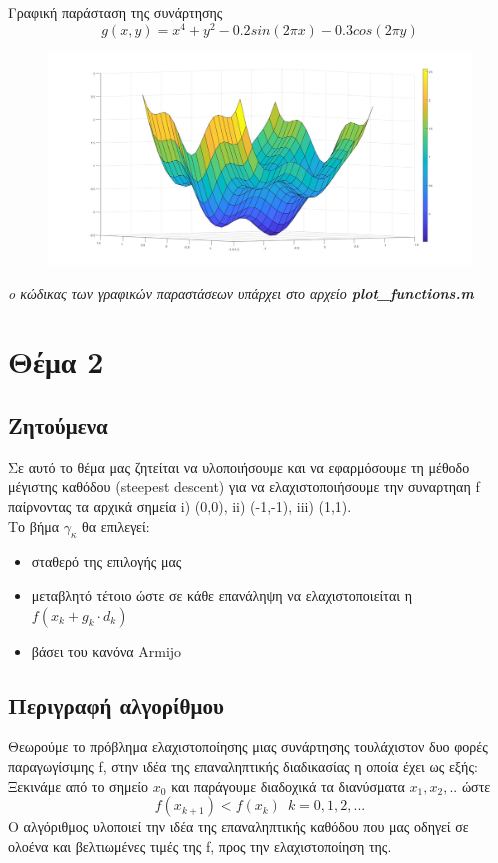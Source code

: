 \documentclass{article}
\begin{document}
Γραφική παράσταση της συνάρτησης 
\begin{equation*}
g(x,y) = x^4 + y^2 - 0.2sin(2πx) - 0.3cos(2πy)
\end{equation*}
\begin{figure}[h!]	
     \centering  
     \advance\leftskip-0.2cm  
  \includegraphics[width=130mm,scale=2]{functionG.jpg}
\end{figure} 

\textit{o κώδικας των γραφικών παραστάσεων υπάρχει στο αρχείο \textbf{plot\_functions.m}}
\clearpage
\section*{Θέμα 2}
\subsection*{Ζητούμενα}
Σε αυτό το θέμα μας ζητείται να υλοποιήσουμε και να εφαρμόσουμε τη μέθοδο μέγιστης καθόδου (steepest descent) για να ελαχιστοποιήσουμε την συναρτηαη f παίρνοντας τα αρχικά σημεία i) (0,0), ii) (-1,-1), iii) (1,1).\\Το βήμα $γ_κ$ θα επιλεγεί:
\begin{itemize}
\item σταθερό της επιλογής μας
\item μεταβλητό τέτοιο ώστε σε κάθε επανάληψη να ελαχιστοποιείται η $f(x_k+g_k \cdot d_k )$ 
\item  βάσει του κανόνα Armijo
\end{itemize}
\subsection*{Περιγραφή αλγορίθμου}
Θεωρούμε το πρόβλημα ελαχιστοποίησης μιας συνάρτησης τουλάχιστον δυο φορές παραγωγίσιμης f, στην ιδέα της επαναληπτικής διαδικασίας η οποία έχει ως εξής:\\
Ξεκινάμε από το σημείο $x_0$ και παράγουμε διαδοχικά τα διανύσματα $x_1,x_2,..$ ώστε
\begin{equation*}
f(x_{k+1}) < f(x_k) \enspace k=0,1,2,...
\end{equation*} 
Ο αλγόριθμος υλοποιεί την ιδέα της επαναληπτικής καθόδου που μας οδηγεί σε ολοένα και βελτιωμένες τιμές της f, προς την ελαχιστοποίηση της.  
\end{document}
